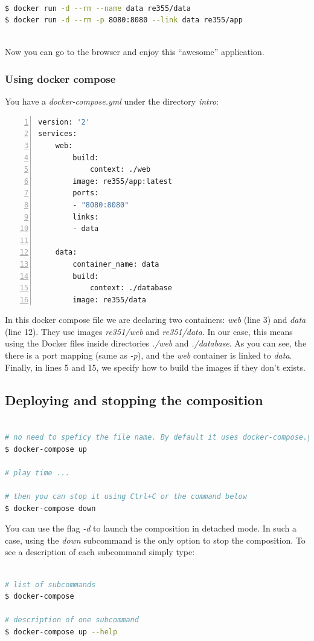\documentclass[a4paper,11pt]{exam}
\begin{document}
\begin{lstlisting}[frame=single,language={sh}]  % Start your code-block

$ docker run -d --rm --name data re355/data
$ docker run -d --rm -p 8080:8080 --link data re355/app 
      
\end{lstlisting}

Now you can go to the browser and enjoy this ``awesome'' application.

\subsubsection*{Using docker compose}
You have a \textit{docker-compose.yml} under the directory \textit{intro}:
\begin{lstlisting}[frame=single,language={sh}, tabsize=2, numbers=left]  
version: '2'
services:
	web:
		build:
			context: ./web
		image: re355/app:latest
		ports:
		- "8080:8080"
		links:
		- data

	data:
		container_name: data
		build:
			context: ./database
		image: re355/data       
\end{lstlisting}

In this docker compose file we are declaring two containers: \textit{web} (line 3) and \textit{data} (line 12).
They use images \textit{re351/web} and \textit{re351/data}.
In our case, this means using the Docker files inside directories \textit{./web} and \textit{./database}.
As you can see, the there is a port mapping (same as \textit{-p}), and the \textit{web} container is linked to \textit{data}.
Finally, in lines 5 and 15, we specify how to build the images if they don't exists. 

\subsection*{Deploying and stopping the composition}
\begin{lstlisting}[frame=single,language={sh}] % Start your code-block

# no need to speficy the file name. By default it uses docker-compose.yml.
$ docker-compose up

# play time ...

# then you can stop it using Ctrl+C or the command below
$ docker-compose down
\end{lstlisting}

You can use the flag \textit{-d} to launch the composition in detached mode. In such a case, using the \textit{down} subcommand is the only option to stop the composition. 
To see a description of each subcommand simply type:
\begin{lstlisting}[frame=single,language={sh}] % Start your code-block

# list of subcommands
$ docker-compose

# description of one subcommand
$ docker-compose up --help
\end{lstlisting}
\end{document}
